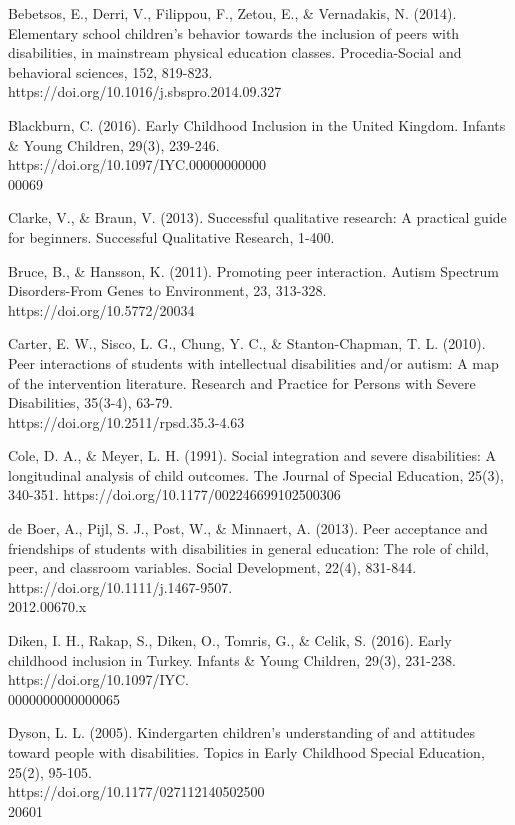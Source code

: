 \documentclass[11pt]{sig-alternate}
\begin{document}
\begin{large}
{Bebetsos, E., Derri, V., Filippou, F., Zetou, E., \& Vernadakis, N. (2014). Elementary school children's behavior towards the inclusion of peers with disabilities, in mainstream physical education classes. Procedia-Social and behavioral sciences, 152, 819-823.‏ \\https://doi.org/10.1016/j.sbspro.2014.09.327

Blackburn, C. (2016). Early Childhood Inclusion in the United Kingdom. Infants & Young Children, 29(3), 239-246. \\https://doi.org/10.1097/IYC.00000000000\\00069 

Clarke, V., \& Braun, V. (2013). Successful qualitative research: A practical guide for beginners. Successful Qualitative Research, 1-400.‏

Bruce, B., \& Hansson, K. (2011). Promoting peer interaction. Autism Spectrum Disorders-From Genes to Environment, 23, 313-328.‏ https://doi.org/10.5772/20034

Carter, E. W., Sisco, L. G., Chung, Y. C., \& Stanton-Chapman, T. L. (2010). Peer interactions of students with intellectual disabilities and/or autism: A map of the intervention literature. Research and Practice for Persons with Severe Disabilities, 35(3-4), 63-79.‏ \\https://doi.org/10.2511/rpsd.35.3-4.63

Cole, D. A., \& Meyer, L. H. (1991). Social integration and severe disabilities: A longitudinal analysis of child outcomes. The Journal of Special Education, 25(3), 340-351.‏ https://doi.org/10.1177/002246699102500306 

de Boer, A., Pijl, S. J., Post, W., \& Minnaert, A. (2013). Peer acceptance and friendships of students with disabilities in general education: The role of child, peer, and classroom variables. Social Development, 22(4), 831-844.‏ https://doi.org/10.1111/j.1467-9507.\\2012.00670.x

Diken, I. H., Rakap, S., Diken, O., Tomris, G., \& Celik, S. (2016). Early childhood inclusion in Turkey. Infants & Young Children, 29(3), 231-238.‏ https://doi.org/10.1097/IYC.\\0000000000000065

Dyson, L. L. (2005). Kindergarten children's understanding of and attitudes toward people with disabilities. Topics in Early Childhood Special Education, 25(2), 95-105.‏ \\https://doi.org/10.1177/027112140502500\\20601

}
\end{large}
\end{document}
